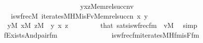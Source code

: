 \begin{isabellebody}
\ \ \ \ \ \ \ \ \ \ \ \ \ \ \ \ \ \ \ \ \ \ \ \ \ \ \ \ {\isacharbrackleft}{\kern0pt}y{\isacharcomma}{\kern0pt}x{\isacharcomma}{\kern0pt}z{\isacharcomma}{\kern0pt}Memrel{\isacharparenleft}{\kern0pt}succ{\isacharparenleft}{\kern0pt}n{\isacharparenright}{\kern0pt}{\isacharparenright}{\kern0pt}{\isacharcomma}{\kern0pt}v{\isacharbrackright}{\kern0pt}{\isacharparenright}{\kern0pt}\isanewline
\ \ \ \ \ \ \ \ {\isasymlongleftrightarrow}\isanewline
\ \ \ \ \ \ \ \ is{\isacharunderscore}{\kern0pt}wfrec{\isacharparenleft}{\kern0pt}{\isacharhash}{\kern0pt}{\isacharhash}{\kern0pt}M{\isacharcomma}{\kern0pt}\ iterates{\isacharunderscore}{\kern0pt}MH{\isacharparenleft}{\kern0pt}{\isacharhash}{\kern0pt}{\isacharhash}{\kern0pt}M{\isacharcomma}{\kern0pt}is{\isacharunderscore}{\kern0pt}F{\isacharcomma}{\kern0pt}v{\isacharparenright}{\kern0pt}{\isacharcomma}{\kern0pt}Memrel{\isacharparenleft}{\kern0pt}succ{\isacharparenleft}{\kern0pt}n{\isacharparenright}{\kern0pt}{\isacharparenright}{\kern0pt}{\isacharcomma}{\kern0pt}\ x{\isacharcomma}{\kern0pt}\ y{\isacharparenright}{\kern0pt}{\isachardoublequoteclose}\isanewline
\ \ \ \ \ \ \ {\isachardoublequoteopen}y{\isasymin}M{\isachardoublequoteclose}\ {\isachardoublequoteopen}x{\isasymin}M{\isachardoublequoteclose}\ {\isachardoublequoteopen}z{\isasymin}M{\isachardoublequoteclose}\ \ y\ x\ z\isanewline
\ \ \ \ \ \ \isamarkupfalse%
\ \ that\ sats{\isacharunderscore}{\kern0pt}is{\isacharunderscore}{\kern0pt}wfrec{\isacharunderscore}{\kern0pt}fm\ {}\ {\isacartoucheopen}v{\isasymin}M{\isacartoucheclose}\ \isamarkupfalse%
\ simp\isanewline
\ \ \ \ \isamarkupfalse%
\isanewline
\ \ \ \ \ \ {\isacharquery}{\kern0pt}f{\isacharequal}{\kern0pt}{\isachardoublequoteopen}Exists{\isacharparenleft}{\kern0pt}And{\isacharparenleft}{\kern0pt}pair{\isacharunderscore}{\kern0pt}fm{\isacharparenleft}{\kern0pt}{}{\isacharcomma}{\kern0pt}{}{\isacharcomma}{\kern0pt}{}{\isacharparenright}{\kern0pt}{\isacharcomma}{\kern0pt}\isanewline
\ \ \ \ \ \ \ \ \ \ \ \ \ \ \ is{\isacharunderscore}{\kern0pt}wfrec{\isacharunderscore}{\kern0pt}fm{\isacharparenleft}{\kern0pt}iterates{\isacharunderscore}{\kern0pt}MH{\isacharunderscore}{\kern0pt}fm{\isacharparenleft}{\kern0pt}is{\isacharunderscore}{\kern0pt}F{\isacharunderscore}{\kern0pt}fm{\isacharcomma}{\kern0pt}{}{\isacharcomma}{\kern0pt}{}{\isacharcomma}{\kern0pt}{}{\isacharcomma}{\kern0pt}{}{\isacharparenright}{\kern0pt}{\isacharcomma}{\kern0pt}{}{\isacharcomma}{\kern0pt}{}{\isacharcomma}{\kern0pt}{}{\isacharparenright}{\kern0pt}{\isacharparenright}{\kern0pt}{\isacharparenright}{\kern0pt}{\isachardoublequoteclose}\isanewline

\end{isabellebody}
